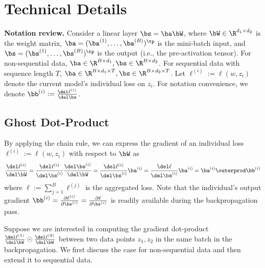 \section{Technical Details}
\label{appendix:efficiency}

\textbf{Notation review.} 
Consider a linear layer $\bs = \ba \bW$, where $\bW \in \R^{d_1 \times d_2}$ is the weight matrix, $\ba = (\ba^{(1)}, \ldots, \ba^{(B)})^\tp$ is the mini-batch input, and $\bs = (\bs^{(1)}, \ldots, \bs^{(B)})^{\tp}$ is the output (i.e., the pre-activation tensor). For non-sequential data, $\ba \in \R^{B \times d_1}, \bs \in \R^{B \times d_2}$. 
For sequential data with sequence length $T$, $\ba \in \R^{B \times d_1 \times T}, \bs \in \R^{B \times d_2 \times T}$. 
Let $\ell^{(i)} := \ell(w, z_i)$ denote the current model's individual loss on $z_i$. For notation convenience, we denote 
$
\bb^{(i)} := \frac{\del \ell^{(i)}}{\del \bs}
$. 

\subsection{Ghost Dot-Product}
\label{appendix:efficiency-linear}

By applying the chain rule, we can express the gradient of an individual loss $\ell^{(i)} := \ell(w, z_i)$ with respect to $\bW$ as
\begin{align}
\frac{\del \ell^{(i)}}{\del \bW} =
\frac{\del \ell^{(i)}}{\del \bs^{(i)}}
\frac{\del \bs^{(i)}}{\del \bW}
= \frac{\del \ell^{(i)} }{\del \bs^{(i)}} \ba^{(i)}
= \frac{\del \ell }{\del \bs^{(i)}} \ba^{(i)}
= \ba^{(i)} \outerprod \bb^{(i)}
\label{eq:linear-decompose}
\end{align}
where $\ell := \sum_{j=1}^B \ell^{(j)}$ is the aggregated loss. Note that the individual's output gradient $\bb^{(i)} = \frac{\partial \ell^{(i)}}{\partial \bs^{(i)}} = \frac{\partial \ell}{\partial \bs^{(i)}}$ is readily available during the backpropagation pass. 

Suppose we are interested in computing the gradient dot-product $\frac{\del \ell^{(1)}}{\del \bW} \odot \frac{\del \ell^{(2)}}{\del \bW}$ between two data points $z_1, z_2$ in the same batch in the backpropagation. We first discuss the case for non-sequential data and then extend it to sequential data. 

